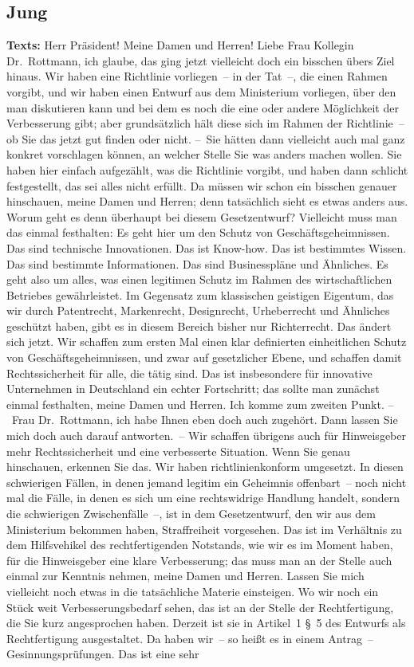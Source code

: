 \documentclass{article}
\begin{document}
\subsection{Jung}
\noindent\textbf{Texts:} Herr Präsident! Meine Damen und Herren! Liebe Frau Kollegin Dr. Rottmann, ich glaube, das ging jetzt vielleicht doch ein bisschen übers Ziel hinaus.  Wir haben eine Richtlinie vorliegen – in der Tat –, die einen Rahmen vorgibt, und wir haben einen Entwurf aus dem Ministerium vorliegen, über den man diskutieren kann und bei dem es noch die eine oder andere Möglichkeit der Verbesserung gibt; aber grundsätzlich hält diese sich im Rahmen der Richtlinie – ob Sie das jetzt gut finden oder nicht.  – Sie hätten dann vielleicht auch mal ganz konkret vorschlagen können, an welcher Stelle Sie was anders machen wollen.  Sie haben hier einfach aufgezählt, was die Richtlinie vorgibt, und haben dann schlicht festgestellt, das sei alles nicht erfüllt. Da müssen wir schon ein bisschen genauer hinschauen, meine Damen und Herren; denn tatsächlich sieht es etwas anders aus. Worum geht es denn überhaupt bei diesem Gesetzentwurf? Vielleicht muss man das einmal festhalten: Es geht hier um den Schutz von Geschäftsgeheimnissen. Das sind technische Innovationen. Das ist Know-how. Das ist bestimmtes Wissen. Das sind bestimmte Informationen. Das sind Businesspläne und Ähnliches. Es geht also um alles, was einen legitimen Schutz im Rahmen des wirtschaftlichen Betriebes gewährleistet. Im Gegensatz zum klassischen geistigen Eigentum, das wir durch Patentrecht, Markenrecht, Designrecht, Urheberrecht und Ähnliches geschützt haben, gibt es in diesem Bereich bisher nur Richterrecht. Das ändert sich jetzt. Wir schaffen zum ersten Mal einen klar definierten einheitlichen Schutz von Geschäftsgeheimnissen, und zwar auf gesetzlicher Ebene, und schaffen damit Rechtssicherheit für alle, die tätig sind. Das ist insbesondere für innovative Unternehmen in Deutschland ein echter Fortschritt; das sollte man zunächst einmal festhalten, meine Damen und Herren.  Ich komme zum zweiten Punkt.  – Frau Dr. Rottmann, ich habe Ihnen eben doch auch zugehört. Dann lassen Sie mich doch auch darauf antworten. – Wir schaffen übrigens auch für Hinweisgeber mehr Rechtssicherheit und eine verbesserte Situation. Wenn Sie genau hinschauen, erkennen Sie das.  Wir haben richtlinienkonform umgesetzt. In diesen schwierigen Fällen, in denen jemand legitim ein Geheimnis offenbart – noch nicht mal die Fälle, in denen es sich um eine rechtswidrige Handlung handelt, sondern die schwierigen Zwischenfälle –, ist in dem Gesetzentwurf, den wir aus dem Ministerium bekommen haben, Straffreiheit vorgesehen. Das ist im Verhältnis zu dem Hilfsvehikel des rechtfertigenden Notstands, wie wir es im Moment haben, für die Hinweisgeber eine klare Verbesserung; das muss man an der Stelle auch einmal zur Kenntnis nehmen, meine Damen und Herren.  Lassen Sie mich vielleicht noch etwas in die tatsächliche Materie einsteigen. Wo wir noch ein Stück weit Verbesserungsbedarf sehen, das ist an der Stelle der Rechtfertigung, die Sie kurz angesprochen haben. Derzeit ist sie in Artikel 1 § 5 des Entwurfs als Rechtfertigung ausgestaltet. Da haben wir – so heißt es in einem Antrag – Gesinnungsprüfungen. Das ist eine sehr 
\end{document}
